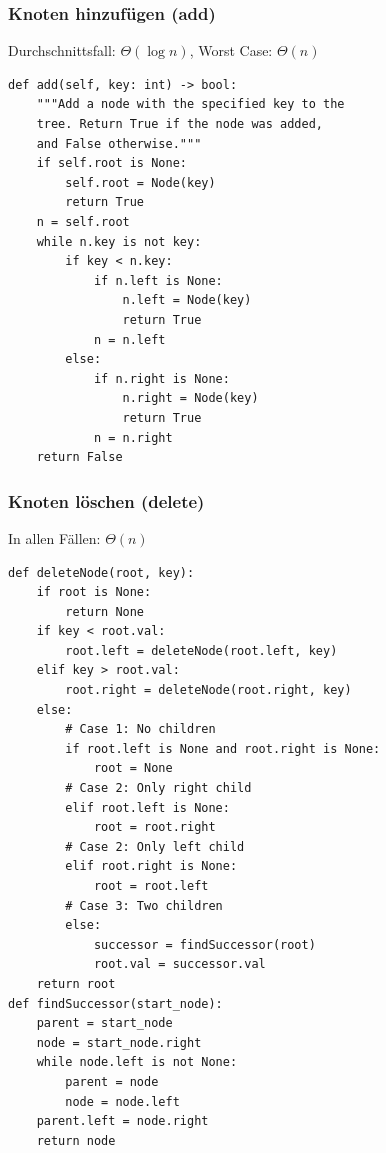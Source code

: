 \subsubsection{Knoten hinzufügen (add)}
\begin{statementbox}
Durchschnittsfall: $\Theta(\log n)$, Worst Case: $\Theta(n)$
\end{statementbox}
\begin{codebox}
\begin{lstlisting}[style=CodeExpert]
def add(self, key: int) -> bool:
    """Add a node with the specified key to the
    tree. Return True if the node was added,
    and False otherwise."""
    if self.root is None:
        self.root = Node(key)
        return True
    n = self.root
    while n.key is not key:
        if key < n.key:
            if n.left is None:
                n.left = Node(key)
                return True
            n = n.left
        else:
            if n.right is None:
                n.right = Node(key)
                return True
            n = n.right
    return False
\end{lstlisting}
\end{codebox}


\subsubsection{Knoten löschen (delete)}
\begin{statementbox}
In allen Fällen: $\Theta(n)$
\end{statementbox}
\begin{codebox}
\begin{lstlisting}[style=CodeExpert]
def deleteNode(root, key):
    if root is None:
        return None
    if key < root.val:
        root.left = deleteNode(root.left, key)
    elif key > root.val:
        root.right = deleteNode(root.right, key)
    else:
        # Case 1: No children
        if root.left is None and root.right is None:
            root = None
        # Case 2: Only right child
        elif root.left is None:
            root = root.right
        # Case 2: Only left child
        elif root.right is None:
            root = root.left
        # Case 3: Two children
        else:
            successor = findSuccessor(root)
            root.val = successor.val
    return root
def findSuccessor(start_node):
    parent = start_node
    node = start_node.right
    while node.left is not None:
        parent = node
        node = node.left
    parent.left = node.right
    return node
\end{lstlisting}
\end{codebox}
